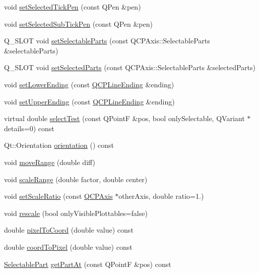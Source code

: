 \begin{DoxyCompactItemize}
\item 
void \hyperlink{classQCPAxis_a8360502685eb782edbf04019c9345cdc}{set\+Selected\+Tick\+Pen} (const Q\+Pen \&pen)
\item 
void \hyperlink{classQCPAxis_a2a00a7166600155eac26843132eb9576}{set\+Selected\+Sub\+Tick\+Pen} (const Q\+Pen \&pen)
\item 
Q\+\_\+\+S\+L\+OT void \hyperlink{classQCPAxis_a513f9b9e326c505d9bec54880031b085}{set\+Selectable\+Parts} (const Q\+C\+P\+Axis\+::\+Selectable\+Parts \&selectable\+Parts)
\item 
Q\+\_\+\+S\+L\+OT void \hyperlink{classQCPAxis_ab9d7a69277dcbed9119b3c1f25ca19c3}{set\+Selected\+Parts} (const Q\+C\+P\+Axis\+::\+Selectable\+Parts \&selected\+Parts)
\item 
void \hyperlink{classQCPAxis_a08af1c72db9ae4dc8cb8a973d44405ab}{set\+Lower\+Ending} (const \hyperlink{classQCPLineEnding}{Q\+C\+P\+Line\+Ending} \&ending)
\item 
void \hyperlink{classQCPAxis_a69119b892fc306f651763596685aa377}{set\+Upper\+Ending} (const \hyperlink{classQCPLineEnding}{Q\+C\+P\+Line\+Ending} \&ending)
\item 
virtual double \hyperlink{classQCPAxis_a2877a6230920c118be65c6113089f467}{select\+Test} (const Q\+PointF \&pos, bool only\+Selectable, Q\+Variant $\ast$details=0) const 
\item 
Qt\+::\+Orientation \hyperlink{classQCPAxis_a57483f2f60145ddc9e63f3af53959265}{orientation} () const 
\item 
void \hyperlink{classQCPAxis_a18f3a68f2b691af1fd34b6593c886630}{move\+Range} (double diff)
\item 
void \hyperlink{classQCPAxis_a7072ff96fe690148f1bbcdb4f773ea1c}{scale\+Range} (double factor, double center)
\item 
void \hyperlink{classQCPAxis_af4bbd446dcaee5a83ac30ce9bcd6e125}{set\+Scale\+Ratio} (const \hyperlink{classQCPAxis}{Q\+C\+P\+Axis} $\ast$other\+Axis, double ratio=1.)
\item 
void \hyperlink{classQCPAxis_a499345f02ebce4b23d8ccec96e58daa9}{rescale} (bool only\+Visible\+Plottables=false)
\item 
double \hyperlink{classQCPAxis_ae9289ef7043b9d966af88eaa95b037d1}{pixel\+To\+Coord} (double value) const 
\item 
double \hyperlink{classQCPAxis_a985ae693b842fb0422b4390fe36d299a}{coord\+To\+Pixel} (double value) const 
\item 
\hyperlink{classQCPAxis_abee4c7a54c468b1385dfce2c898b115f}{Selectable\+Part} \hyperlink{classQCPAxis_ab2965a8ab1da948b897f1c006080760b}{get\+Part\+At} (const Q\+PointF \&pos) const 

\end{DoxyCompactItemize}
